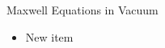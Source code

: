 \begin{frame}{Maxwell Equations in Vacuum}
\label{fr:meq_vacuum_intro}

\begin{itemize}
\item New item
\end{itemize}

\end{frame}